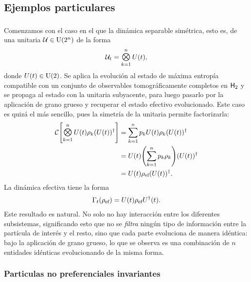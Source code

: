 \subsection{Ejemplos particulares}

\subsubsection{}

Comenzamos con el caso en el que la dinámica separable simétrica, esto es, de una unitaria $\mathcal{U}\in\text{U}(2^{n})$ de la forma
\begin{equation}
    \mcU_{t}=\Motimes_{k=1}^{n}U(t),\nonumber
\end{equation}
donde $U(t)\in\text{U}(2)$. Se aplica la evolución al estado de máxima entropía compatible con un conjunto de observables tomográficamente completos en ${\sf H}_{2}$ y se propaga al estado con la unitaria subyacente, para luego pasarlo por la aplicación de grano grueso y recuperar el estado efectivo evolucionado. Este caso es quizá el más sencillo, pues la simetría de la unitaria permite factorizarla:
\begin{align}
\mcC\qty[\Motimes_{k=1}^{n}U(t) \rho_{k} (U(t))^{\dag}]&=\sum_{k=1}^{n}p_{k} U(t) \rho_{k} (U(t))^{\dag}\nonumber \\
&=U(t)\qty(\sum_{k=1}^{n}p_{k} \rho_{k}) (U(t))^{\dag}\nonumber\\
&=U(t)\rho_{\ef}(U(t))^{\dag}.\nonumber
\end{align}
La dinámica efectiva tiene la forma
\begin{equation}\label{eq:EffectiveSymmetricLocal}
    \Gamma_{t}(\rho_{\text{ef}})=U(t)\rho_{\text{ef}}U^\dag(t).\nonumber
\end{equation}
Este resultado es natural. No solo no hay interacción entre los diferentes subsistemas, significando esto que no se \textit{filtra} ningún tipo de información entre la partícula de interés y el resto, sino que cada parte evoluciona de manera idéntica: bajo la aplicación de grano grueso, lo que se observa es una combinación de $n$ entidades idénticas evolucionando de la misma forma.

\subsubsection{Particulas no preferenciales invariantes}

